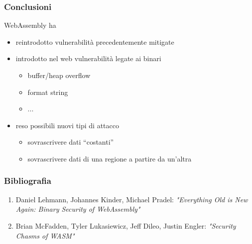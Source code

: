 \documentclass{beamer}
\begin{document}
\begin{frame}
  \frametitle{Conclusioni}
  WebAssembly ha

  \vspace{0.2in}
  \begin{itemize}
    \item reintrodotto vulnerabilità precedentemente mitigate 
    \pause
    \item introdotto nel web vulnerabilità legate ai binari
      \begin{itemize}
        \item buffer/heap overflow
        \item format string
        \item ...
      \end{itemize}
    \pause
    \item reso possibili nuovi tipi di attacco
      \begin{itemize}
        \item sovrascrivere dati ``costanti''
        \item sovrascrivere dati di una regione a partire da un'altra
      \end{itemize}
  \end{itemize}
\end{frame}

\begin{frame}
  \frametitle{Bibliografia}
  \begin{enumerate}
    \item Daniel Lehmann, Johannes Kinder, Michael Pradel: \emph{"Everything Old is New Again:
      Binary Security of WebAssembly"}
    \item Brian McFadden, Tyler Lukasiewicz, Jeff Dileo, Justin Engler:
      \emph{"Security Chasms of WASM"}
  \end{enumerate}
\end{frame}
\end{document}
